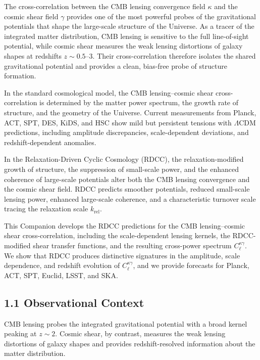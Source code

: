 \documentclass[11pt,a4paper]{article}
\begin{document}
The cross-correlation between the CMB lensing convergence field $\kappa$ and the cosmic 
shear field $\gamma$ provides one of the most powerful probes of the gravitational 
potentials that shape the large-scale structure of the Universe. As a tracer of the 
integrated matter distribution, CMB lensing is sensitive to the full line-of-sight 
potential, while cosmic shear measures the weak lensing distortions of galaxy shapes at 
redshifts $z \sim 0.5$--$3$. Their cross-correlation therefore isolates the shared 
gravitational potential and provides a clean, bias-free probe of structure formation.

In the standard cosmological model, the CMB lensing--cosmic shear cross-correlation is 
determined by the matter power spectrum, the growth rate of structure, and the geometry of 
the Universe. Current measurements from Planck, ACT, SPT, DES, KiDS, and HSC show mild but 
persistent tensions with $\Lambda$CDM predictions, including amplitude discrepancies, 
scale-dependent deviations, and redshift-dependent anomalies.

In the Relaxation-Driven Cyclic Cosmology (RDCC), the relaxation-modified growth of 
structure, the suppression of small-scale power, and the enhanced coherence of large-scale 
potentials alter both the CMB lensing convergence and the cosmic shear field. RDCC predicts 
smoother potentials, reduced small-scale lensing power, enhanced large-scale coherence, and 
a characteristic turnover scale tracing the relaxation scale $k_{\mathrm{rel}}$.

This Companion develops the RDCC predictions for the CMB lensing--cosmic shear 
cross-correlation, including the scale-dependent lensing kernels, the RDCC-modified shear 
transfer functions, and the resulting cross-power spectrum $C_{\ell}^{\kappa \gamma}$. We 
show that RDCC produces distinctive signatures in the amplitude, scale dependence, and 
redshift evolution of $C_{\ell}^{\kappa \gamma}$, and we provide forecasts for Planck, ACT, 
SPT, Euclid, LSST, and SKA.

\subsection*{1.1 Observational Context}

CMB lensing probes the integrated gravitational potential with a broad kernel peaking at 
$z \sim 2$. Cosmic shear, by contrast, measures the weak lensing distortions of galaxy 
shapes and provides redshift-resolved information about the matter distribution.
\end{document}
